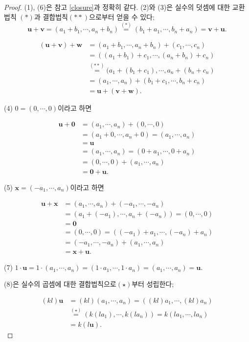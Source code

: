 \documentclass{oblivoir}
\begin{document}
\begin{proof}
(1), (6)은 참고 \ref{closure}과 정확히 같다.
(2)와 (3)은 실수의 덧셈에 대한 교환법칙 \((*)\)과 결합법칙\((**)\)으로부터 얻을 수 있다;
\[\boldsymbol{u}+\boldsymbol{v}=(a_1+b_1,\cdots,a_n+b_n)\stackrel{(*)}{=}(b_1+a_1,\cdots,b_n+a_n)=\boldsymbol{v}+\boldsymbol{u}.\]

\begin{align*}
(\boldsymbol{u}+\boldsymbol{v})+\boldsymbol{w}
&=(a_1+b_1,\cdots,a_n+b_n)+(c_1,\cdots,c_n)\\
&=((a_1+b_1)+c_1,\cdots,(a_n+b_n)+c_n)\\
&\stackrel{(**)}{=}(a_1+(b_1+c_1),\cdots,a_n+(b_n+c_n)\\
&=(a_1,\cdots,a_n)+(b_1+c_1,\cdots,b_n+c_n)\\
&=\boldsymbol{u}+(\boldsymbol{v}+\boldsymbol{w}).
\end{align*}

(4) \(0=(0,\cdots,0)\)이라고 하면

\begin{align*}
\boldsymbol{u}+\mathbf0
&=(a_1,\cdots,a_n)+(0,\cdots,0)\\
&=(a_1+0,\cdots,a_n+0)=(a_1,\cdots,a_n)\\
&=\boldsymbol{u}\\
&=(a_1,\cdots,a_n)=(0+a_1,\cdots,0+a_n)\\
&=(0,\cdots,0)+(a_1,\cdots,a_n)\\
&=\mathbf0+\boldsymbol{u}.
\end{align*}

(5) \(\boldsymbol x=(-a_1,\cdots,a_n)\)이라고 하면

\begin{align*}
\boldsymbol{u}+\boldsymbol x
&=(a_1,\cdots,a_n)+(-a_1,\cdots,-a_n)\\
&=(a_1+(-a_1),\cdots,a_n+(-a_n))=(0,\cdots,0)\\
&=\mathbf0\\
&=(0,\cdots,0)=((-a_1)+a_1,\cdots,(-a_n)+a_n)\\
&=(-a_1,\cdots,-a_n)+(a_1,\cdots,a_n)\\
&=\boldsymbol x+\boldsymbol{u}.
\end{align*}

(7)
\(1\cdot \boldsymbol{u}=1\cdot(a_1,\cdots,a_n)=(1\cdot a_1,\cdots,1\cdot a_n)=(a_1,\cdots,a_n)=\boldsymbol{u}\).

(8)은 실수의 곱셈에 대한 결합법칙으로\((\star)\)부터 성립한다;

\begin{align*}
(kl)\boldsymbol{u}
&=(kl)(a_1,\cdots,a_n)=((kl)a_1,\cdots,(kl)a_n)\\
&\stackrel{(\star)}{=}(k(la_1),\cdots,k(la_n))=k(la_1,\cdots,la_n)\\
&=k(l\boldsymbol{u}).
\end{align*}



\end{proof}
\end{document}
